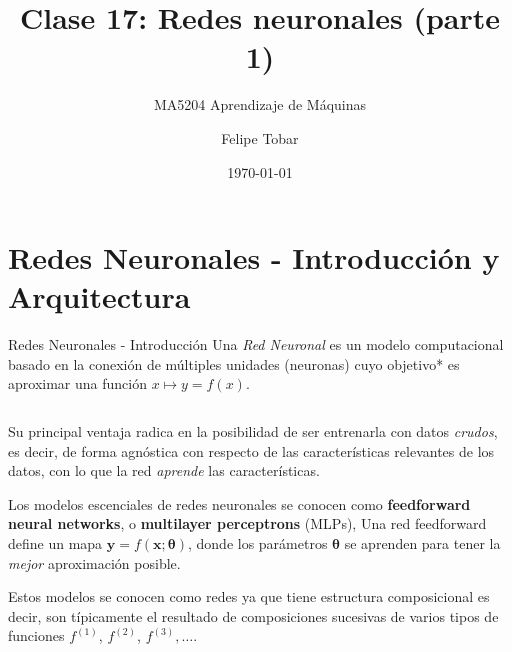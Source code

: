 \documentclass[handout, 9pt]{beamer}
\title{Clase 17: Redes neuronales (parte 1)}
\subtitle{MA5204 Aprendizaje de Máquinas}
\date{\today}
\author{Felipe Tobar}
\institute{Department of Mathematical Engineering \&\\ Center for Mathematical Modelling\\Universidad de Chile}
\begin{document}
\begin{frame}
  \titlepage
\end{frame}

\section{Redes Neuronales - Introducción y Arquitectura}
\begin{frame}{Redes Neuronales - Introducción}
Una \textit{Red Neuronal} es un modelo computacional basado en la conexión de múltiples unidades (neuronas) cuyo objetivo* es aproximar una función $x\mapsto y=f(x)$.
\pause

\begin{columns}

  \begin{column}{0.5\textwidth}

  Su principal ventaja radica en la posibilidad de ser entrenarla con datos \emph{crudos}, es decir, de forma agnóstica con respecto de las características relevantes de los datos, con lo que la red \emph{aprende} las características. \pause

  \vspace{0.1cm}
  Los modelos escenciales de redes neuronales se conocen como \textbf{feedforward neural networks}, o \textbf{multilayer perceptrons} (MLPs), Una red feedforward define un mapa $\bm{y}=f(\bm{x}; \bm{\theta})$, donde los parámetros $\bm{\theta}$ se aprenden para tener la \emph{mejor} aproximación posible. \pause

  \vspace{0.1cm}

  Estos modelos se conocen como redes ya que tiene estructura composicional es decir, son típicamente el resultado de composiciones sucesivas de varios tipos de funciones $f^{(1)}$, $f^{(2)}$, $f^{(3)}, \dots$. \pause


\end{column}
\end{columns}
\end{frame}
\end{document}
